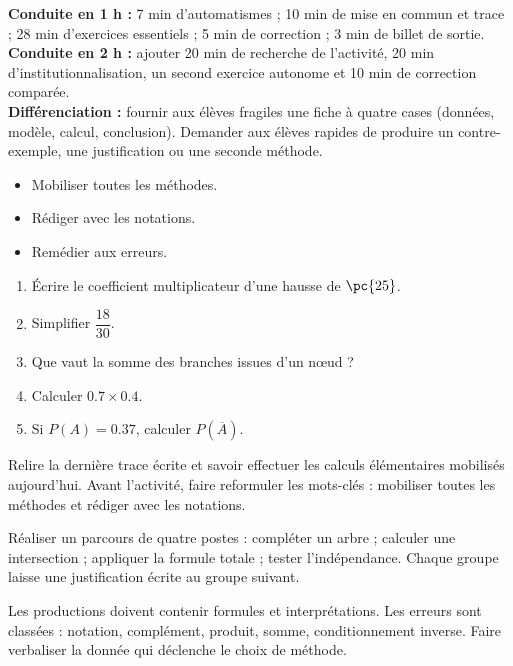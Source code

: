     \ifmxteacher
    \begin{method}
    \textbf{Conduite en 1 h :} 7 min d'automatismes ; 10 min de mise en commun et trace ; 28 min d'exercices essentiels ; 5 min de correction ; 3 min de billet de sortie.\\
    \textbf{Conduite en 2 h :} ajouter 20 min de recherche de l'activité, 20 min d'institutionnalisation, un second exercice autonome et 10 min de correction comparée.\\
    \textbf{Différenciation :} fournir aux élèves fragiles une fiche à quatre cases (données, modèle, calcul, conclusion). Demander aux élèves rapides de produire un contre-exemple, une justification ou une seconde méthode.
    \end{method}
    \fi
{}
\begin{objectives}\begin{itemize}\item Mobiliser toutes les méthodes.\item Rédiger avec les notations.\item Remédier aux erreurs.\end{itemize}\end{objectives}
\begin{fluency}\begin{enumerate}\item Écrire le coefficient multiplicateur d'une hausse de $\pc{25}$. \item Simplifier $\dfrac{18}{30}$. \item Que vaut la somme des branches issues d'un nœud ? \item Calculer $\num{0,7}\times\num{0,4}$. \item Si $P(A)=\num{0,37}$, calculer $P(\overline A)$. \end{enumerate}\end{fluency}
\begin{prerequisites}Relire la dernière trace écrite et savoir effectuer les calculs élémentaires mobilisés aujourd'hui. Avant l'activité, faire reformuler les mots-clés : mobiliser toutes les méthodes et rédiger avec les notations.\end{prerequisites}

\begin{activity}
Réaliser un parcours de quatre postes : compléter un arbre ; calculer une intersection ; appliquer la formule totale ; tester l'indépendance. Chaque groupe laisse une justification écrite au groupe suivant.

\end{activity}
\begin{solution}Les productions doivent contenir formules et interprétations. Les erreurs sont classées : notation, complément, produit, somme, conditionnement inverse. Faire verbaliser la donnée qui déclenche le choix de méthode.\end{solution}

